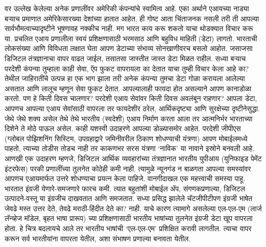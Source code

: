 वर उल्लेख केलेल्या अनेक प्रणालींवर अमेरिकी कंपन्यांचे स्वामित्व आहे. एका अर्थाने एआयच्या नाड्या बऱ्याच प्रमाणात अमेरिकेसारख्या देशांच्या हातात आहेत. ही गोष्ट आता चिंताजनक नसली तरी ती आपल्या सार्वभौमत्वाच्यादृष्टीने भूषणावह नक्कीच नाही. मग भारत काय करू शकतो याचा थोडक्यात विचार करू या. प्रचलित एआय प्रणालीला स्वयं प्रशिक्षणासाठी भरमसाठ आणि बहुविध माहिती (डेटा) लागतो. भारताची लोकसंख्या आणि विविधता लक्षात घेता आपण डेटाच्या संभाव्य सोनखाणीवरच बसलो आहोत. जसाजसा डिजिटल तंत्रज्ञानाचा वापर वाढत जाईल, तसातसा जास्तीत जास्त डेटा मिळत राहील. सध्या बऱ्याच परदेशी कंपन्या तुम्हाला काही सेवा, ऍप फुकट वापरायला का देतात याचा तुम्ही विचार केला आहे का? तेथील जाहिरातींचे उत्पन्न हा एक भाग झाला तरी अनेक कंपन्या तुमचा डेटा गोळा करायला आलेल्या असतात आणि लालूच म्हणून सेवा फुकट देतात. आपल्यालाही फायदा होत असल्याने आपण कानाडोळा करतो. पण हे किती दिवस चालणार? परदेशी एआय सेवांवर किती दिवस अवलंबून राहणार? आपला डेटा, आपणच आपल्या एआय सेवांसाठी वापरला तर फायदेशीर ठरेल, आर्थिकदृष्ट्या आणि सुरक्षेच्या दृष्टीनेसुद्धा. जेथे जेथे शक्य असेल तेथे तेथे भारतीय (स्वदेशी) एआय निर्माण करता आला तर आत्मनिर्भर भारताच्या दिशेने ते मोठे पाऊल असेल. काही यशस्वी उदाहरणे आपल्या डोळ्यासमोर आहेत. परदेशी जीपीएस (ग्लोबल पोझिशनिंग सिस्टिम, उपग्रहाद्वारे जमिनीवरील ठिकाण शोधण्याची यंत्रणा) आपण मोबाईलमध्ये पाहतो, त्याच्या तोडीस तोडच नाही तर काकणभर सरस यंत्रणा `नाविक' या नावाने इस्रोने बनवली आहे. आणखी एक उदाहरण म्हणजे, डिजिटल आर्थिक व्यवहारांच्या तंत्रज्ञानात भारतीय युपीआय (युनिफाइड पेमेंट इंटरफेस) परकी प्रणालींच्या तुलनेत कोठेही कमी नाही. त्यामुळे न्यूनगंड न बाळगता आपल्या समस्यांवर आपणच एआयमार्फत उत्तरे शोधण्याचा प्रयत्न केला पाहिजे. वानगीदाखल एक महत्त्वाची समस्या पाहू. भारतात इंग्रजी येणारे-समजणारे फारच कमी.  त्यात बहुतांशी मोबाईल ॲप, संगणकप्रणाल्या, डिजिटल उत्पादने-वस्तू या इंग्रजीच दाखवतात आणि समजतात. सध्या प्रसिद्ध झालेले चॅटजीपीटीपण इंग्रजी भाषेत जेवढे मस्त उत्तर देते, तेवढे मराठी-हिंदीत देते का? नाही. याचे कारण त्यामागे असलेल्या एल-एल-एम (लार्ज लॅन्व्हेज मॉडेल, बृहत भाषा प्रारूप) च्या प्रशिक्षणासाठी भारतीय भाषांच्या तुलनेत इंग्रजी डेटा खूप वापरला होता. हे चित्र बदलायचे आले तर भारतीय भाषांची `एल-एल-एम' प्रशिक्षित करावी लागतील. त्याचा वापर करून सर्व भारतीयांना वापरता येतील, अशा संभाषण प्रणाल्या बनावता येतील.

